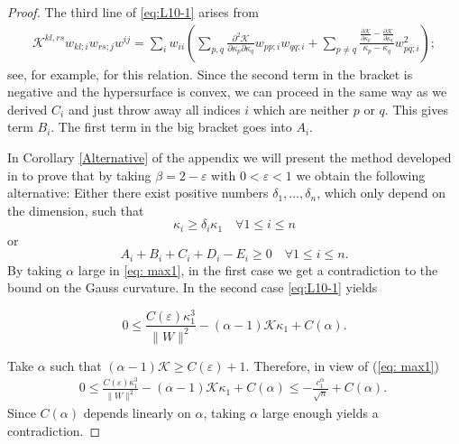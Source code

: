 \documentclass{amsart}
\theoremstyle{definition}
\theoremstyle{remark}
\newtheorem{remark}[theorem]{Remark}
\numberwithin{equation}{section}
\begin{document}
\begin{proof}
The third line of \eqref{eq:L10-1} arises from
\begin{align*}
\mathcal{K}^{kl,rs}w_{kl;i}w_{rs;j}w^{ij}=\sum_i w_{ii}\left(\sum_{p,q}\frac{\partial^2\mathcal{K}}{\partial \kappa_p\partial\kappa_q}w_{pp;i}w_{qq;i}+\sum_{p\neq q}\frac{\frac{\partial\mathcal{K}}{\partial \kappa_p}-\frac{\partial\mathcal{K}}{\partial\kappa_q}}{\kappa_p-\kappa_q} w_{pq;i}^2\right);
\end{align*}
see, for example, \cite[Lemma~2.1.14]{Gerhardt:/2006} for this relation. Since the second term in the bracket is negative and the hypersurface is convex, we can proceed in the same way as we derived $C_i$ and just throw away all indices $i$ which are neither $p$ or $q$. This gives term $B_i$. The first term in the big bracket goes into $A_i$.


In Corollary \ref{Alternative} of the appendix we will present the method developed in \cite{Guan} to prove that by taking $\beta=2-\varepsilon$ with $0<\varepsilon<1$ we obtain the following alternative: Either there exist positive numbers $\delta_1,\dots,\delta_n$, which only depend on the dimension, such that
\[\kappa_i\geq \delta_i\kappa_1\quad\forall 1\leq i\leq n\]
or 
\[A_i+B_i+C_i+D_i-E_i\geq 0\quad\forall 1\leq i\leq n.\]
By taking $\alpha$ large in \eqref{eq: max1}, in the first case we get a contradiction to the bound on the Gauss curvature. In the second case \eqref{eq:L10-1} yields


\[0\leq \frac{C(\varepsilon)\kappa_1^3}{\|W\|^2}-(\alpha-1) \mathcal{K}\kappa_1
+C(\alpha).\]

Take $\alpha$ such that $ (\alpha-1) \mathcal{K}\geq C(\varepsilon)+1$. Therefore, in view of (\ref{eq: max1})
\begin{align}\label{x}
0\leq \frac{C(\varepsilon)\kappa_1^3}{\|W\|^2}-(\alpha-1) \mathcal{K}\kappa_1
+C(\alpha)\leq -\frac{c_1^{\alpha}}{\sqrt{n}}+C(\alpha).\
\end{align}
Since $C(\alpha)$ depends linearly on $\alpha$, taking $\alpha$ large enough yields a contradiction.
\end{proof}
\end{document}

